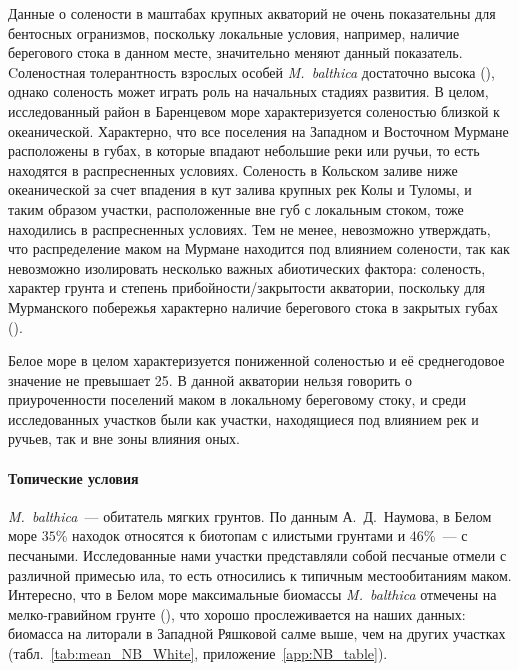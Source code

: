 Данные о солености в маштабах крупных акваторий не очень показательны для бентосных огранизмов, поскольку локальные условия, например, наличие берегового стока в данном месте, значительно меняют данный показатель. 
Cоленостная толерантность взрослых особей {\it M.~balthica} достаточно высока (\cite{Naumov_2006}), однако соленость может играть роль на начальных стадиях развития.
В целом, исследованный район в Баренцевом море характеризуется соленостью близкой к океанической.
Характерно, что все поселения на Западном и Восточном Мурмане расположены в губах, в которые впадают небольшие реки или ручьи, то есть находятся в распресненных условиях.
Соленость в Кольском заливе ниже океанической за счет впадения в кут залива крупных рек Колы и Туломы, и таким образом участки, расположенные вне губ с локальным стоком, тоже находились в распресненных условиях.
Тем не менее, невозможно утверждать, что распределение маком на Мурмане находится под влиянием солености, так как невозможно изолировать несколько важных абиотических фактора: соленость, характер грунта и степень прибойности/закрытости акватории, поскольку для Мурманского побережья характерно наличие берегового стока в закрытых губах (\cite{Guryanova_Ushakov_1929, Guryanova_et_al_1930}).

Белое море в целом характеризуется пониженной соленостью и её среднегодовое значение не превышает 25\permil.
В данной акватории нельзя говорить о приуроченности поселений маком в локальному береговому стоку, и среди исследованных участков были как участки, находящиеся под влиянием рек и ручьев, так и вне зоны влияния оных.

		\paragraph{Топические условия}
\textit{M.~balthica}~--- обитатель мягких грунтов.
По данным А.~Д.~Наумова, в Белом море $35$\% находок относятся к биотопам с илистыми грунтами и $46$\%~--- с песчаными. 
Исследованные нами участки представляли собой песчаные отмели с различной примесью ила, то есть относились к типичным местообитаниям маком.
Интересно, что в Белом море максимальные биомассы \textit{M.~balthica} отмечены на мелко-гравийном грунте (\cite{Naumov_2006}), что хорошо прослеживается на наших данных: биомасса на литорали в Западной Ряшковой салме выше, чем на других участках (табл.~\ref{tab:mean_NB_White}, приложение~\ref{app:NB_table}).

\afterpage{\clearpage}


